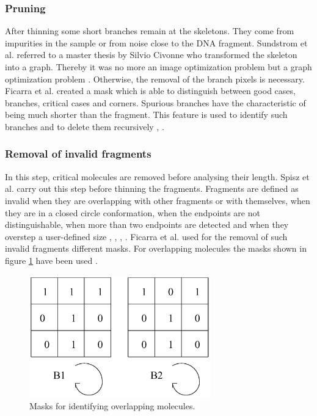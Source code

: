 \documentclass{article}
\begin{document}
\subsubsection{Pruning}

After thinning some short branches remain at the skeletons. They come from impurities in the sample or from noise close to the DNA fragment. Sundstrom et al. referred to a master thesis by Silvio Civonne who transformed the skeleton into a graph. Thereby it was no more an image optimization problem but a graph optimization problem \cite{sundstrom2012image}. Otherwise, the removal of the branch pixels is necessary. Ficarra et al. created a mask which is able to distinguish between good cases, branches, critical cases and corners. Spurious branches have the characteristic of being much shorter than the fragment. This feature is used to identify such branches and to delete them recursively \cite{ficarra2002automated}, \cite{ficarra2005automated}.  



\subsubsection{Removal of invalid fragments}

In this step, critical molecules are removed before analysing their length. Spisz et al. carry out this step before thinning the fragments. Fragments are defined as invalid when they are overlapping with other fragments or with themselves, when they are in a closed circle conformation, when the endpoints are not distinguishable, when more than two endpoints are detected and when they overstep a user-defined size \cite{spisz1998automated}, \cite{ficarra2005automated}, \cite{ficarra2002automated}, \cite{ficarra2005automatic}. Ficarra et al. used for the removal of such invalid fragments different masks. For overlapping molecules the masks shown in figure \ref{fig: Masken} have been used \cite{ficarra2005automated}.

\begin{figure}[htb]
\begin{center}
\includegraphics[width = 0.7\textwidth]{Masken}
\end{center}
\caption{Masks for identifying overlapping molecules.\cite{ficarra2002automated}}
\label{fig: Masken} %
\end{figure}
\end{document}
